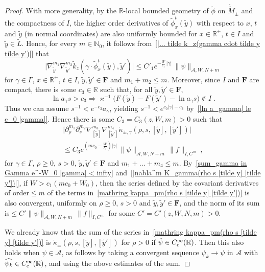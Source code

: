 \documentclass{memo-l}
\theoremstyle{plain}
\theoremstyle{definition}
\theoremstyle{remark}
\newcommand{\N}{\mathbb{N}}
\newcommand{\R}{\mathbb{R}}
\renewcommand{\AA}{\mathcal{A}}
\newcommand{\bfF}{\boldsymbol{F}}
\newcommand{\Cinftyc}{C^\infty_{\text{\rm c}}}
\numberwithin{section}{chapter}
\numberwithin{equation}{section}%
\begin{document}
\begin{proof}
With more generality, by the $\R$-local bounded geometry of $\tilde\phi$ on $\mathring{\widetilde M}_\pm$ and the compactness of $I$, the higher order derivatives of $\tilde\phi^t_x(\tilde y)$ with respect to $x$, $t$ and $\tilde y$ (in normal coordinates) are also uniformly bounded for $x\in\R^\pm$, $t\in I$ and $\tilde y\in\widetilde L$. Hence, for every $m\in\N_0$, it follows from~\eqref{|... tilde k_z(gamma cdot tilde y tilde y')|} that
\[
\Big|\nabla_{\tilde y}^{m_1}\nabla_{\tilde y'}^{m_2}
\tilde k_z(\gamma\cdot\tilde\phi^t_x(\tilde y),\tilde y')\Big|
\le C'_1 e^{-\frac{W}{c_1}\,|\gamma|}\,\|\psi\|_{\AA, W, N+m}
\]
for $\gamma\in\Gamma$, $x\in\R^\pm$, $t \in I$, $\tilde y,\tilde y' \in \bfF$ and $m_1+m_2\le m$. Moreover, since $I$ and $\bfF$ are compact, there is some $c_3\in\R$ such that, for all $\tilde y,\tilde y'\in\bfF$,
\[
\ln a_\gamma s>c_3\Rightarrow\varkappa^{-1}\big(F(\tilde y)-F(\tilde y')-\ln a_\gamma s\big)\notin I\;.
\]
Thus we can assume $s^{-1}<e^{-c_3}a_\gamma$, yielding $s^{-1}<e^{c_0|\gamma|-c_3}$ by~\eqref{|ln a_gamma| le c_0 |gamma|}. Hence there is some $C_3=C_3(z,W,m)>0$ such that
\begin{multline}\label{|nabla^m K_gamma(rho s [tilde y] [tilde y'])|}
\big|\partial^{m_1}_\rho\partial^{m_2}_s\nabla^{m_3}_{[\tilde y]}\nabla^{m_4}_{[\tilde y']}
\mathring\kappa_{\pm,\gamma}(\rho,s,[\tilde y],[\tilde y'])\big|\\
\le C_3 e^{(mc_0-\frac{W}{c_1})|\gamma|}\,\|\psi\|_{\AA,W,N+m}\,\|f\|_{I,C^m}\;,
\end{multline}
for $\gamma\in\Gamma$, $\rho\ge0$, $s>0$, $\tilde y,\tilde y'\in \bfF$ and $m_1+\dots+m_4\le m$. By~\eqref{sum_gamma in Gamma e^-W_0 |gamma| < infty} and~\eqref{|nabla^m K_gamma(rho s [tilde y] [tilde y'])|}, if $W>c_1(mc_0+W_0)$, then the series defined by the covariant derivatives of order${}\le m$ of the terms in~\eqref{mathring kappa_pm(rho s [tilde y] [tilde y'])} is also convergent, uniformly on $\rho\ge0$, $s>0$ and $\tilde y,\tilde y'\in \bfF$, and the norm of its sum is${}\le C' \|\psi\|_{\AA, W,N+m}\,\|f\|_{I,C^m}$ for some $C'=C'(z,W,N,m)>0$.

We already know that the sum of the series in~\eqref{mathring kappa_pm(rho s [tilde y] [tilde y'])} is $\mathring\kappa_\pm(\rho,s,[\tilde y],[\tilde y'])$ for $\rho>0$ if $\hat\psi\in\Cinftyc(\R)$. Then this also holds when $\psi\in\AA$, as follows by taking a convergent sequence $\psi_k\to\psi$ in $\AA$ with $\widehat{\psi_k}\in\Cinftyc(\R)$, and using the above estimates of the sum.
\end{proof}
\end{document}
